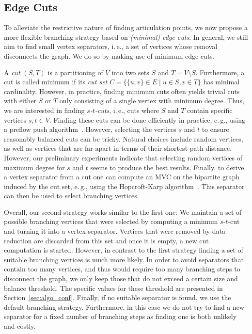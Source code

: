 \documentclass[a4paper,UKenglish,cleveref, autoref, thm-restate]{lipics-v2021}
\newcommand{\ie}{i.\,e.,\xspace}
\newcommand{\eg}{e.\,g.,\xspace}
\begin{document}
\subsection{Edge Cuts}
To alleviate the restrictive nature of finding articulation points, we now propose a more flexible branching strategy based on \emph{(minimal) edge cuts}.
In general, we still aim to find small vertex separators, \ie a set of vertices whose removal disconnects the graph.
We do so by making use of minimum edge cuts.

A \emph{cut} $(S,T)$ is a partitioning of $V$ into two sets $S$ and $T=V\setminus S$.
Furthermore, a cut is called minimum if its \emph{cut set} $C = \{\{u,v\} \in E \mid u \in S, v \in T\}$ has minimal cardinality.
However, in practice, finding minimum cuts often yields trivial cuts with either $S$ or $T$ only consisting of a single vertex with minimum degree. 
Thus, we are interested in finding \emph{$s$-$t$-cuts}, \ie cuts where $S$ and $T$ contain specific vertices $s,t \in V$.
Finding these cuts can be done efficiently in practice, \eg using a preflow push algorithm~\cite{goldberg1988new}.
However, selecting the vertices $s$ and $t$ to ensure reasonably balanced cuts can be tricky.
Natural choices include random vertices, as well as vertices that are far apart in terms of their shortest path distance.
However, our preliminary experiments indicate that selecting random vertices of maximum degree
 for $s$ and $t$ seems to produce the best results.
Finally, to derive a vertex separator from a cut one can compute an MVC on the bipartite graph induced by the cut set, \eg using the Hopcroft-Karp algorithm~\cite{hopcroft1973n}.
This separator can then be used to select branching vertices.

Overall, our second strategy works similar to the first one: We maintain a set of possible branching vertices that were selected by computing a minimum $s$-$t$-cut and turning it into a vertex separator.
Vertices that were removed by data reduction are discarded from this set and once it is empty, a new cut computation is started.
However, in contrast to the first strategy finding a set of suitable branching vertices is much more likely.
In order to avoid separators that contain too many vertices, and thus would require too many branching steps to disconnect the graph, we only keep those that do not exceed a certain size and balance threshold.
The specific values for these threshold are presented in Section~\ref{sec:algo_conf}.
Finally, if no suitable separator is found, we use the default branching strategy.
Furthermore, in this case we do not try to find a new separator for a fixed number of branching steps as finding one is both unlikely and costly.
\end{document}
